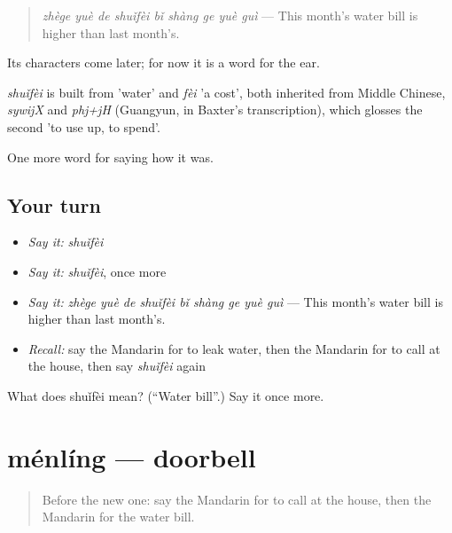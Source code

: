\begin{quote}
\emph{zhège yuè de shuǐfèi bǐ shàng ge yuè guì} — This month's water bill is higher than last month's.
\end{quote}

Its characters come later; for now it is a word for the ear.

\begin{cousinweb}
\emph{shuǐfèi} is built from  'water' and \emph{fèi} 'a cost', both inherited from Middle Chinese, \emph{sywijX} and \emph{phj+jH} (Guangyun, in Baxter's transcription), which glosses the second 'to use up, to spend'.
\end{cousinweb}

\begin{grammarlens}[title={What you've built}]
One more word for saying how it was.
\end{grammarlens}

\subsection*{Your turn}
\begin{itemize}
\raggedright
  \item \emph{Say it:} \emph{shuǐfèi}
  \item \emph{Say it:} \emph{shuǐfèi}, once more
  \item \emph{Say it:} \emph{zhège yuè de shuǐfèi bǐ shàng ge yuè guì} — This month's water bill is higher than last month's.
  \item \emph{Recall:} say the Mandarin for to leak water, then the Mandarin for to call at the house, then say \emph{shuǐfèi} again
\end{itemize}

\begin{tcolorbox}[breakable,colback=teal!4,colframe=teal!35!black,title={Before you move on}]
What does shuǐfèi mean? (\textquotedblleft{}Water bill\textquotedblright{}.) Say it once more.
\end{tcolorbox}
\section[ménlíng]{ménlíng — doorbell}

\label{lesson:ZH-C522-menling}



\begin{quote}
Before the new one: say the Mandarin for to call at the house, then the Mandarin for the water bill.
\end{quote}

